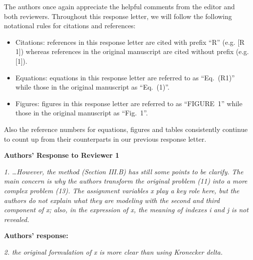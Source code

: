 \documentclass[onecolumn, 11pt, draftclsnofoot]{IEEEtran}
\begin{document}
The authors once again appreciate the helpful comments from the editor and both
reviewers.
Throughout this response letter, we will follow the following notational
rules for citations and references:
\begin{itemize}
  \item Citations: references in this response letter are cited with prefix
  ``R'' (e.g. [R 1]) whereas references in the original manuscript are cited
  without prefix (e.g. [1]).
  \item Equations: equations in this response letter are referred to as
  ``Eq.~(R1)''  while those in the original manuscript as ``Eq.~(1)''.
  \item Figures: figures in this response letter are referred to as
  ``FIGURE~1''  while those in the original manuscript as ``Fig.~1''.
\end{itemize}
Also the reference numbers for equations, figures and tables
consistently continue to count up from their counterparts in our previous
response letter.

\begin{center}
  {\LARGE \textbf{Authors' Response to Reviewer 1}}
\end{center}


 
\noindent
\emph{1. \ldots However, the method (Section III.B) has still some points to be
clarify. The main concern is why the authors transform the original problem (11)
into a more complex problem (13). The assignment variables x play a key role
here, but the authors do not explain what they are modeling with the second and
third component of x; also, in the expression of x, the meaning of indexes i and
j is not revealed.}

\noindent \textbf{Authors' response:} 

\vspace{0.5cm}

\noindent
\emph{2. the original formulation of x is more clear than using Kronecker delta.
}
\end{document}

